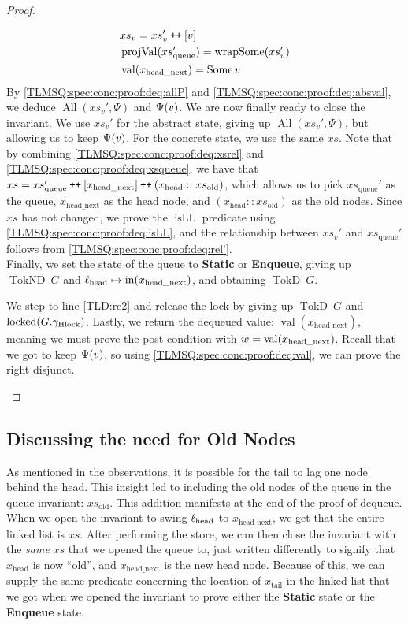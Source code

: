 \documentclass[a4paper, 10pt]{report}
\theoremstyle{definition}
\newcommand{\locked}{\operatorname{locked}}
\newcommand{\xsc}{xs}
\newcommand{\xsqueue}{xs_{\mathrm{queue}}}
\newcommand{\xsold}{xs_{\mathrm{old}}}
\newcommand{\isLL}{\operatorname{isLL}}
\newcommand{\AllP}{\operatorname{All}}
\newcommand{\projval}{\operatorname{projVal}}
\newcommand{\wrapsome}{\operatorname{wrapSome}}
\newcommand{\locN}[1]{\loc_{\mathrm{#1}}}
\newcommand{\lochead}{\locN{head}}
\newcommand{\nodeval}{\valB}
\newcommand{\nIn}[1]{\operatorname{in}(#1)}
\newcommand{\nVal}[1]{\operatorname{val}(#1)}
\newcommand{\node}{x}
\newcommand{\nodeN}[1]{\node_{\mathrm{#1}}}
\newcommand{\nodehead}{\nodeN{head}}
\newcommand{\nodetail}{\nodeN{tail}}
\newcommand{\nodeheadnext}{\nodeN{head\_next}}
\newcommand{\absvalue}{\val}
\newcommand{\absvalueList}{xs_v}
\newcommand{\StaticState}{\textbf{Static}\xspace}
\newcommand{\EnqueueState}{\textbf{Enqueue}\xspace}
\newcommand{\Qg}{G}
\newcommand{\ghlock}{\gname_{\mathrm{Hlock}}}
\newcommand{\TokD}[1]{\operatorname{TokD} ~ #1}
\newcommand{\TokDQg}{\TokD{\Qg}}
\newcommand{\TokND}[1]{\operatorname{TokND} ~ #1}
\newcommand{\TokNDQg}{\TokND{\Qg}}
\newcommand\catenate{\mathbin{\text{\ttfamily\upshape ++}}}
\begin{document}
\begin{proof}
\begin{itemize}
  \begin{align}
    &\absvalueList = \absvalueList' \catenate [\absvalue]\label{TLMSQ:spec:conc:proof:deq:absval}\\
    &\projval(\xsqueue') = \wrapsome(\absvalueList')\label{TLMSQ:spec:conc:proof:deq:rel'}\\
    &\nVal{\nodeheadnext} = \Some{\absvalue}\label{TLMSQ:spec:conc:proof:deq:val}
  \end{align}
  By \ref{TLMSQ:spec:conc:proof:deq:allP} and \ref{TLMSQ:spec:conc:proof:deq:absval}, we deduce $\AllP(\absvalueList', \Psi)$ and $\Psi(\absvalue)$. We are now finally ready to close the invariant. We use $\absvalueList'$ for the abstract state, giving up $\AllP(\absvalueList', \Psi)$, but allowing us to keep $\Psi(\absvalue)$. For the concrete state, we use the same $\xsc$. Note that by combining \ref{TLMSQ:spec:conc:proof:deq:xsrel} and \ref{TLMSQ:spec:conc:proof:deq:xsqueue}, we have that $\xsc = \xsqueue' \catenate [\nodeheadnext] \catenate (\nodehead :: \xsold)$, which allows us to pick $\xsqueue'$ as the queue, $\nodeheadnext$ as the head node, and $(\nodehead :: \xsold)$ as the old nodes. Since $\xsc$ has not changed, we prove the $\isLL$ predicate using \ref{TLMSQ:spec:conc:proof:deq:isLL}, and the relationship between $\absvalueList'$ and $\xsqueue'$ follows from \ref{TLMSQ:spec:conc:proof:deq:rel'}.\\
  Finally, we set the state of the queue to \StaticState or \EnqueueState, giving up $\TokNDQg$ and $\lochead \mapsto \nIn{\nodeheadnext}$, and obtaining $\TokDQg$.

  We step to line \ref{TLD:re2} and release the lock by giving up $\TokDQg$ and $\locked(\Qg.\ghlock)$. Lastly, we return the dequeued value: $\nVal{\nodeheadnext}$, meaning we must prove the post-condition with $\nodeval = \nVal{\nodeheadnext}$. Recall that we got to keep $\Psi(\absvalue)$, so using \ref{TLMSQ:spec:conc:proof:deq:val}, we can prove the right disjunct.
\end{itemize}
\end{proof}

\subsection{Discussing the need for Old Nodes}
\label{TLMSQSPECS:concurrent:sub:xs_old}

As mentioned in the observations, it is possible for the tail to lag one node behind the head. This insight led to including the old nodes of the queue in the queue invariant: $\xsold$. This addition manifests at the end of the proof of dequeue. When we open the invariant to swing $\lochead$ to $\nodeheadnext$, we get that the entire linked list is $\xsc$. After performing the store, we can then close the invariant with the \emph{same} $\xsc$ that we opened the queue to, just written differently to signify that $\nodehead$ is now ``old'', and $\nodeheadnext$ is the new head node. Because of this, we can supply the same predicate concerning the location of $\nodetail$ in the linked list that we got when we opened the invariant to prove either the \StaticState state or the \EnqueueState state.
\end{document}
